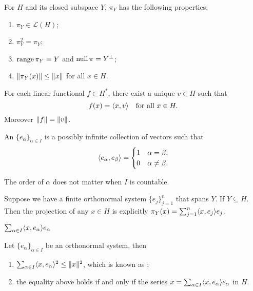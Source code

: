\begin{prop}
    For $H$ and its closed subspace $Y$, $\pi_Y$ has the following properties:
    \begin{enumerate}
        \item $\pi_Y \in \mathcal{L}(H)$;
        \item $\pi_Y^2 =\pi_Y$;
        \item $\operatorname{range} \pi_Y = Y$ and $\operatorname{null} \pi = Y^\perp$;
        \item $\lVert \pi_Y(x) \rVert \leq \lVert x \rVert$ for all $x \in H$.
    \end{enumerate}
\end{prop}

\begin{namedthm}
    For each linear functional $f \in H^*$, there exist a unique $v \in H$ such that \[
        f(x) = \langle x, v \rangle\quad\text{for all }x\in H.
    \] Moreover $\lVert f \rVert = \lVert v \rVert$.
\end{namedthm}

An  $\{e_\alpha\}_{\alpha \in I}$ is a possibly infinite collection of vectors such that \[\langle e_\alpha, e_\beta \rangle = \begin{cases}
    1 & \alpha = \beta, \\
    0 & \alpha \neq \beta.\end{cases}
\]

The order of $\alpha$ does not matter when $I$ is countable.

\begin{prop}
    Suppose we have a finite orthonormal system $\{e_j\}_{j=1}^n$ that spans $Y$. If $Y \subseteq H$. Then the projection of any $x\in H$ is explicitly $\pi_Y(x) = \sum_{j=1}^n \langle x, e_j \rangle e_j$.
\end{prop}

\begin{prop}
    $\sum_{\alpha \in I}\langle x, e_\alpha \rangle e_\alpha$ 
\end{prop}

\begin{thm}
Let $\{e_\alpha\}_{\alpha\in I}$ be an orthonormal system, then \begin{enumerate}
    \item $\sum_{\alpha \in I} \langle x, e_\alpha \rangle^2 \leq \lVert x \rVert^2$, which is known as ;
    \item the equality above holds if and only if the series $x = \sum_{\alpha \in I}\langle x, e_\alpha \rangle e_\alpha$ in $H$.
\end{enumerate}
\end{thm}

